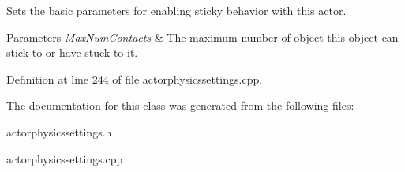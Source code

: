Sets the basic parameters for enabling sticky behavior with this actor. 


\begin{DoxyParams}{Parameters}
{\em MaxNumContacts} & The maximum number of object this object can stick to or have stuck to it. \\
\hline
\end{DoxyParams}


Definition at line 244 of file actorphysicssettings.cpp.



The documentation for this class was generated from the following files:\begin{DoxyCompactItemize}
\item 
actorphysicssettings.h\item 
actorphysicssettings.cpp\end{DoxyCompactItemize}
